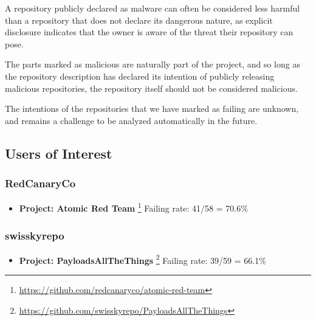 \documentclass[]{acmart}
\begin{document}
A repository publicly declared as malware can often be considered less harmful than a repository that does not declare its dangerous nature, as explicit disclosure indicates that the owner is aware of the threat their repository can pose.

The parts marked as malicious are naturally part of the project, and so long as the repository description has declared its intention of publicly releasing malicious repositories, the repository itself should not be considered malicious. 

The intentions of the repositories that we have marked as failing are unknown, and remains a challenge to be analyzed automatically in the future. 

\subsection{Users of Interest}
\subsubsection{RedCanaryCo} 
\begin{itemize}
    \item { \bf Project: Atomic Red Team }\footnote{\url{https://github.com/redcanaryco/atomic-red-team}} Failing rate: 41/58 = 70.6\%
\end{itemize}

\subsubsection{swisskyrepo}
\begin{itemize}
    \item { \bf Project: PayloadsAllTheThings } \footnote{\url{https://github.com/swisskyrepo/PayloadsAllTheThings}} 
    Failing rate: 39/59 = 66.1\%
\end{itemize}
\end{document}
